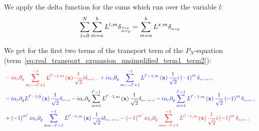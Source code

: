 We apply the delta function for the sums which run over the variable $l$:
\begin{align}
\sum_{l=0}^{N}\sum_{m=a}^{b}L^{l,m}\delta_{\scaleto{\substack{l=x\\m=y}}{9pt}}=\sum_{m=a}^{b}L^{x,m}\delta_{\scaleto{m=y}{3pt}}
\end{align}

We get for the first two terms of the transport term of the $P_N$-equation (term~\ref{eq:real_transport_expansion_unsimplified_term1_term2}):
\begin{align*}
&
\mathcolor{red}{-i}
\mathcolor{red}{\alpha_c\partial_y
\sum_{m=-l'+1}^{-1}L^{l'-1,m}\left (\vec{x}\right)
\frac{1}{\sqrt{2}}
i\delta_{\scaleto{m=m'-1}{4pt}}
}
\mathcolor{blue}{
+i
}
\mathcolor{blue}{
\alpha_c\partial_y
\sum_{m=-l'+1}^{-1}L^{l'-1,m}\left (\vec{x}\right)
\frac{1}{\sqrt{2}}
i
\left({-1}\right)^{m}
\delta_{\scaleto{m=-m'+1}{4pt}}
}
\\&
\mathcolor{blue}
{
-i
}
\mathcolor{blue}
{
\alpha_c\partial_y
L^{l'-1,0}\left (\vec{x}\right)
\frac{1}{\sqrt{2}}
\delta_{\scaleto{m'=1}{4pt}}
}
\mathcolor{black}
{
-i
}
\mathcolor{black}
{
\alpha_c\partial_y
\sum_{m=1}^{l'-1}L^{l'-1,m}\left (\vec{x}\right)
\frac{1}{\sqrt{2}}
\delta_{\scaleto{m=-m'+1}{4pt}}
}
\mathcolor{blue}
{
-i
}
\mathcolor{blue}
{
\alpha_c\partial_y
\sum_{m=1}^{l'-1}L^{l'-1,m}\left (\vec{x}\right)
\frac{1}{\sqrt{2}}
\left({-1}\right)^{m}
\delta_{\scaleto{m=m'-1}{4pt}}
}
\\&
\mathcolor{blue}
{
+\left({-1}\right)^{m'}i
}
\mathcolor{blue}{
\alpha_c\partial_y
\sum_{m=-l'+1}^{-1}L^{l'-1,m}\left (\vec{x}\right)
\frac{1}{\sqrt{2}}
i
\delta_{\scaleto{m=-m'+1}{4pt}}
}
\mathcolor{red}
{
-\left({-1}\right)^{m'}i
}
\mathcolor{red}
{
\alpha_c\partial_y
\sum_{m=-l'+1}^{-1}L^{l'-1,m}\left (\vec{x}\right)
\frac{1}{\sqrt{2}}
i
\left({-1}\right)^{m}
\delta_{\scaleto{m=m'-1}{4pt}}
}

\end{align*}

